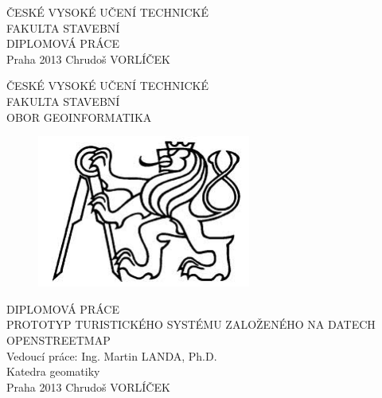 \documentclass[11pt,a4paper,titlepage,oneside]{book}
\begin{document}
\rhead{\leftmark}
\cfoot{\thepage}
\setlength{\headheight}{24pt}

\pagestyle{empty}	%

\begin{titlepage} %
	\begin{center}
		{\huge ČESKÉ VYSOKÉ UČENÍ TECHNICKÉ} \\ [0.25cm]
		{\LARGE FAKULTA STAVEBNÍ}
		\\[9cm]		
		{\Huge DIPLOMOVÁ PRÁCE}
		\\[9cm]
		{\Large Praha 2013  Chrudoš VORLÍČEK}
	\end{center}
\end{titlepage}

\begin{titlepage} %
	\begin{center}
		{\huge ČESKÉ VYSOKÉ UČENÍ TECHNICKÉ} \\
		{\LARGE FAKULTA STAVEBNÍ \\ [0.25cm]OBOR GEOINFORMATIKA}
		\\[1cm]
		\begin{figure}[!h]
		\begin{center}
		\includegraphics[height=5cm]{obrazky/lev.jpg}
		\\[1cm]
		\end{center}
		\end{figure}							
		{\Huge DIPLOMOVÁ PRÁCE \\ [0.25cm]}
		{\LARGE \uppercase {Prototyp turistického systému zaloŽeného na datech \\[0.25cm] OpenStreetMap}}
		\\[3.5cm]
		{\Large Vedoucí práce: Ing. Martin LANDA, Ph.D. \\[0.25cm] Katedra geomatiky}
		\\[1cm]
		{\Large Praha 2013  Chrudoš VORLÍČEK}
	\end{center}
\end{titlepage}
\end{document}
